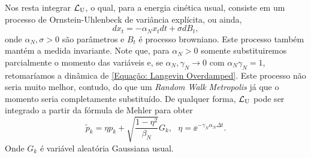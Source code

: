 Nos resta integrar $\operatorname{\mathcal{L}}_{\operatorname{U}}$, o qual, para a energia cinética usual, consiste em um processo de Ornstein-Uhlenbeck de variância explícita, ou ainda, $$dx_t = - \alpha_N x_t dt + \sigma dB_t,$$ onde $\alpha_N, \sigma > 0$ são parâmetros e $B_t$ é processo browniano. Este processo também mantém a medida invariante. Note que, para $\alpha_N > 0$ somente substituiremos parcialmente o momento das variáveis e, se $\alpha_N, \gamma_N \rightarrow 0$ com $\alpha_N \gamma_N = 1$, retomaríamos a dinâmica de \ref{Equação: Langevin Overdamped}. Este processo não seria muito melhor, contudo, do que um \textit{Random Walk Metropolis} \cite[Capítulo~5]{handbookmontecarlo} já que o momento seria completamente substituído. De qualquer forma, $\operatorname{\mathcal{L}}_{\operatorname{U}}$ pode ser integrado a partir da fórmula de Mehler para obter
\begin{equation}
\tilde{p}_k = \eta p_k + \sqrt{\frac{1-\eta^2}{\beta_N}} G_k, \ \ \ \eta = \ee^{-\gamma_N \alpha_N \Delta t}.
\label{Equation: Mehler}
\end{equation}
Onde $G_k$ é variável aleatória Gaussiana usual.

